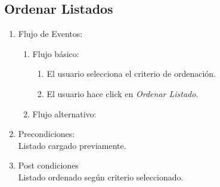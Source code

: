 \documentclass[a4paper,11pt]{article}
\begin{document}
\subsection{Ordenar Listados}
\begin{enumerate}

%    

    \begin{enumerate}
    \item Descripción breve: \\
        Se le permite al usuario ordenar un listado siguiendo diversos criterios.
    \item Actores \\
        Usuario genérico.
    \item Disparadores: \\
        El usuario hace click en \emph{Ordenar Listado}.
    \end{enumerate}

    \item Flujo de Eventos: 

    \begin{enumerate}

        \item Flujo básico:
        \begin{enumerate}
                    \item El usuario selecciona el criterio de ordenación.
                    \item El usuario hace click en \emph{Ordenar Listado}.
        \end{enumerate}
        \item Flujo alternativo:\\

    \end{enumerate}

    \item Precondiciones: \\
        Listado cargado previamente.

    \item Post condiciones \\
        Listado ordenado según criterio seleccionado.

\end{enumerate}

\end{document}
